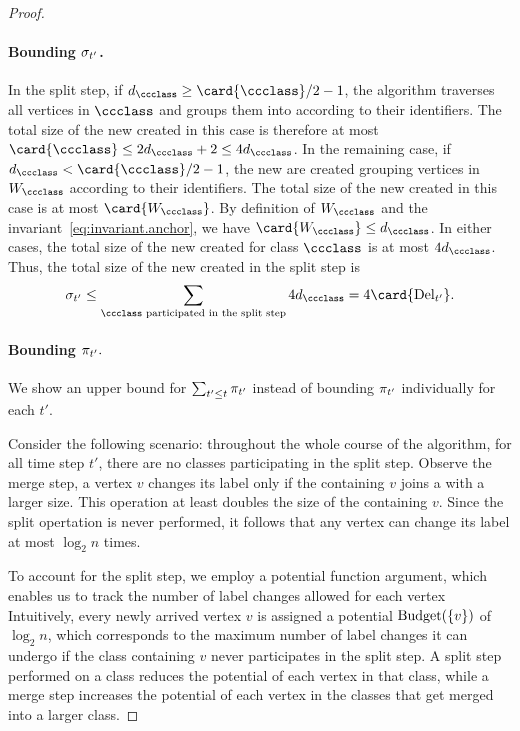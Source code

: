 \begin{proof}
    \paragraph{Bounding $ \sigma_{t'} $.}\label{par:bounding.newpiecesize} %
    In the split step, if $ d_{\ccclass} \geq \card{\ccclass}/2-1 $, the algorithm traverses all vertices in $ \ccclass $ and groups them into  according to their identifiers. 
    The total size of the new  created in this case is therefore at most $ \card{\ccclass} \leq 2d_{\ccclass}+2 \leq 4d_{\ccclass} $.
    In the remaining case, if $ d_{\ccclass} < \card{\ccclass}/2-1 $, the new  are created grouping vertices in $ W_{\ccclass} $ according to their identifiers.
    The total size of the new  created in this case is at most $ \card{W_{\ccclass}} $.
    By definition of $ W_{\ccclass} $ and the invariant~\eqref{eq:invariant.anchor}, we have $ \card{W_{\ccclass}} \leq d_{\ccclass} $.
    In either cases, the total size of the new  created for class $ \ccclass $ is at most $ 4d_{\ccclass} $.
    Thus, the total size of the new  created in the split step is
    \begin{align}
        \newpiecesize{t'} \leq \sum_{\ccclass \text{ participated in the split step}} 4d_{\ccclass} = 4\card{\delt{t'}}. \label{eq:bound.newpiecesize}
    \end{align}

    \paragraph{Bounding $ \pi_{t'}.$}\label{par:bounding_smallpiecesize_t_} %
    We show an upper bound for $ \sum_{t'\leq t} \pi_{t'} $ instead of bounding $ \pi_{t'} $ individually for each $ t' $.

    Consider the following scenario: throughout the whole course of the algorithm, for all time step $ t' $, there are no classes participating in the split step.
    Observe the merge step, a vertex $ v $ changes its label only if the \piece{} containing $ v $ joins a \piece{} with a larger size.
    This operation at least doubles the size of the \piece{} containing $ v $.
    Since the split opertation is never performed, it follows that any vertex can change its label at most $ \log_{2}n $ times.

    To account for the split step, we employ a potential function argument, which enables us to track the number of label changes allowed for each vertex
    Intuitively, every newly arrived vertex $ v $ is assigned a potential $ \mathrm{Budget}(\{v\}) $ of $ \log_{2}n $, which corresponds to the maximum number of label changes it can undergo if the class containing $ v $ never participates in the split step.
    A split step performed on a class reduces the potential of each vertex in that class, while a merge step increases the potential of each vertex in the classes that get merged into a larger class.


\end{proof}
